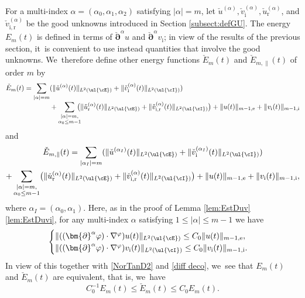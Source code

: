 For a multi-index $\alpha=(\alpha_0,\alpha_1,\alpha_2)$ satisfying $|\alpha|=m$, let $\check{u}^{(\alpha)}, \check{v}_\mathrm{i}^{(\alpha)},
\check{u}_\mathrm{r}^{(\alpha)}$, and $\check{v}_\mathrm{i,r}^{(\alpha)}$ be the good unknowns introduced in Section \ref{subsect:defGU}.
The energy $E_{m}(t)$ is defined in terms of $\check{\bm{\partial}}^\alpha u$ and $\check{\bm{\partial}}^\alpha v_\mathrm{i}$;
in view of the results of the previous section, it~is convenient to use instead quantities that involve the good unknowns. We~therefore define other energy functions $\check{E}_m(t)$ and $\check{E}_{m,\parallel}(t)$ of order $m$ by
\begin{align*}
\check{E}_m(t)
= \sum_{|\alpha|=m}&(\|\check{u}^{(\alpha)}(t)\|_{L^2(\ul{\cE})} + \|\check{v}_\mathrm{i}^{(\alpha)}(t)\|_{L^2(\ul{\cI})}) \\[-3pt]
&+ \sum_{\substack{|\alpha|=m, \\ \alpha_0\leq m-1}}\hspace*{-2mm}\bigl(\|\check{u}_\mathrm{r}^{(\alpha)}(t)\|_{L^2(\ul{\cE})} + \|\check{v}_\mathrm{i,r}^{(\alpha)}(t)\|_{L^2(\ul{\cI})}\bigr)
+ \|u(t)\|_{m-1,{\rm e}} + \|v_\mathrm{i}(t)\|_{m-1,{\rm i}}
\end{align*}
and
\begin{multline*}
\check{E}_{m,\parallel}(t)
= \sum_{|\alpha_I|=m}(\|\check{u}^{(\alpha_I)}(t)\|_{L^2(\ul{\cE})} + \|\check{v}_\mathrm{i}^{(\alpha_I)}(t)\|_{L^2(\ul{\cI})}) \\
+ \sum_{\substack{|\alpha|=m,\\ \alpha_0\leq m-1}}\bigl(\|\check{u}_\mathrm{r}^{(\alpha)}(t)\|_{L^2(\ul{\cE})} + \|\check{v}_\mathrm{i,r}^{(\alpha)}(t)\|_{L^2(\ul{\cI})}\bigr)
+ \|u(t)\|_{m-1,{\rm e}} + \|v_\mathrm{i}(t)\|_{m-1,{\rm i}},
\end{multline*}
where $\alpha_I=(\alpha_0,\alpha_1)$.
Here, as in the proof of Lemma \ref{lem:EstDuv}\eqref{lem:EstDuvi}, for any multi-index $\alpha$ satisfying $1\leq|\alpha|\leq m-1$ we have
\[
\begin{cases}
\|((\bm{\partial}^\alpha\varphi)\cdot\nabla^\varphi)u(t)\|_{L^2(\ul{\cE})} \leq C_0\|u(t)\|_{m-1,{\rm e}}, \\
\|((\bm{\partial}^\alpha\varphi)\cdot\nabla^\varphi)v_\mathrm{i}(t)\|_{L^2(\ul{\cI})} \leq C_0\|v_\mathrm{i}(t)\|_{m-1,{\rm i}}.
\end{cases}
\]
In view of this together with \eqref{NorTanD2} and \eqref{diff deco}, we~see that $E_m(t)$ and $\check{E}_m(t)$ are equivalent, that is, we~have
\begin{equation}\label{eqEcEm}
C_0^{-1}E_m(t) \leq \check{E}_m(t) \leq C_0E_m(t).
\end{equation}
